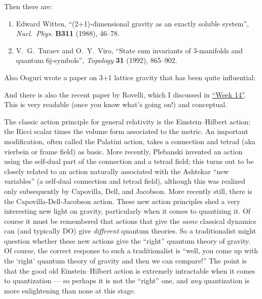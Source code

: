\documentclass{article}
\def\tightlist{}
\renewcommand{\texttt}[1]{%
  \begingroup
  \ttfamily
  \begingroup\lccode`~=`/\lowercase{\endgroup\def~}{/\discretionary{}{}{}}%
  \begingroup\lccode`~=`[\lowercase{\endgroup\def~}{[\discretionary{}{}{}}%
  \begingroup\lccode`~=`.\lowercase{\endgroup\def~}{.\discretionary{}{}{}}%
  \catcode`/=\active\catcode`[=\active\catcode`.=\active
  \scantokens{#1\noexpand}%
  \endgroup
}
\begin{document}
Then there are:

\begin{enumerate}
\def\labelenumi{\arabic{enumi})}
\setcounter{enumi}{6}
\item
  Edward Witten, ``(2+1)-dimensional gravity as an exactly soluble system'', 
  \emph{Nucl.\ Phys.} \textbf{B311} (1988), 46--78.
\item
  V.\ G.\ Turaev and O.\ Y.\ Viro,  ``State sum invariants of 3-manifolds and 
  quantum 6j-symbols'', \emph{Topology} \textbf{31} (1992), 865--902.
\end{enumerate}

Also Ooguri wrote a paper on 3+1 lattice gravity that has been quite
influential:

\noindent
And there is also the recent paper by Rovelli, which I discussed in
\protect\hyperlink{week14}{``Week 14''}. This is very readable (once you
know what's going on!) and conceptual.


The classic action principle for general relativity is the
Einstein--Hilbert action: the Ricci scalar times the volume form
associated to the metric. An important modification, often called the
Palatini action, takes a connection and tetrad (aka vierbein or frame
field) as basic. More recently, Plebanski invented an action using the
self-dual part of the connection and a tetrad field; this turns out to
be closely related to an action naturally associated with the Ashtekar
``new variables'' (a self-dual connection and tetrad field), although
this was realized only subsequently by Capovilla, Dell, and Jacobson.
More recently still, there is the Capovilla-Dell-Jacobson action. These
new action principles shed a very interesting new light on gravity,
particularly when it comes to quantizing it. Of course it must be
remembered that actions that give the \emph{same} classical dynamics can
(and typically DO) give \emph{different} quantum theories. So a
traditionalist might question whether these new actions give the
``right'' quantum theory of gravity. Of course, the correct response to
such a traditionalist is ``well, you come up with the `right' quantum
theory of gravity and then we can compare!'' The point is that the good
old Einstein--Hilbert action is extremely intractable when it comes to
quantization --- so perhaps it is not the ``right'' one, and \emph{any}
quantization is more enlightening than none at this stage.
\end{document}

